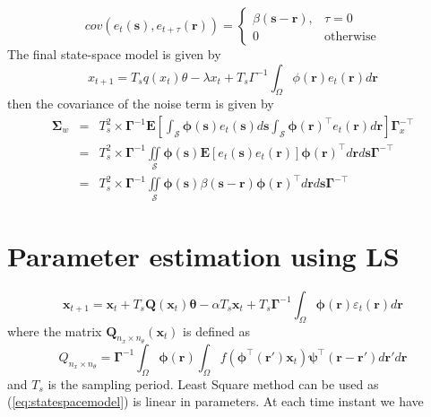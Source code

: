 \documentclass[onecolumn,draftcls]{IEEEtran}
\begin{document}
\begin{equation}
cov(e_t(\mathbf{s}),e_{t+\tau}(\mathbf{r}))=
\begin{cases}
\beta\left(\mathbf{s}-\mathbf{r}\right), & \tau=0 \\
0 & \mathrm{otherwise}
\end{cases}
\label{eq:FieldCovariance}
\end{equation}
The final state-space model is given by
\begin{equation}
x_{t + 1} = T_sq(x_t)\theta -\lambda x_t + T_s\Gamma^{-1}\int_\Omega  {\phi ( \mathbf{r} )e_t( \mathbf{r} )d\mathbf{r}}
\end{equation}
then the covariance of the noise term is given by
\begin{eqnarray}
\mathbf \Sigma_w&{}={}&T_s^2 \times \mathbf{\Gamma}^{-1}\mathbf E[\int_{\mathcal{S}}\boldsymbol\phi\left(\mathbf s\right)e_t\left(\mathbf s\right)d\mathbf s\int_{\mathcal{S}}\boldsymbol\phi\left(\mathbf r\right)^{\top}e_t\left(\mathbf r\right)d\mathbf r]\mathbf{\Gamma}_{x}^{- \top} \nonumber \\
&=&T_s^2 \times\mathbf{\Gamma}^{-1}\iint\limits_{\mathcal{S}}\boldsymbol\phi\left(\mathbf s\right) \mathbf E[e_t\left(\mathbf s\right)e_t\left(\mathbf r\right)]\boldsymbol\phi\left(\mathbf r\right)^{\top}d\mathbf r d\mathbf s\mathbf{\Gamma}^{- \top} \nonumber\\
&=&{}T_s^2 \times\mathbf{\Gamma}^{-1}\iint\limits_{\mathcal{S}}\boldsymbol\phi\left(\mathbf s\right) \beta\left(\mathbf s- \mathbf r \right)\boldsymbol\phi\left(\mathbf r\right)^{\top}d\mathbf r d\mathbf s\mathbf{\Gamma}^{- \top} 
\end{eqnarray}

\section{Parameter estimation using LS}
\begin{equation}
 \mathbf x_{t+1}=\mathbf x_{t}+T_s \mathbf Q(\mathbf x_t)\mathbf \theta-\alpha T_s\mathbf x_t+T_s\boldsymbol\Gamma^{-1}\int_\Omega\boldsymbol\phi(\mathbf r)\varepsilon_t(\mathbf r)d\mathbf r
\label{eq:statespacemodel}
\end{equation}
where the matrix $\mathbf Q_{n_x \times n_{\theta}}(\mathbf x_t)$ is defined as
\begin{equation}
 Q_{n_x \times n_{\theta}}=\boldsymbol\Gamma^{-1}\int_\Omega\boldsymbol\phi(\mathbf r)\int_\Omega f(\boldsymbol\phi^\top(\mathbf r')\mathbf x_t)\boldsymbol\psi^\top(\mathbf r-\mathbf r')d\mathbf r'd\mathbf r
\end{equation}
and $T_s$ is the sampling period. Least Square method can be used as (\ref{eq:statespacemodel}) is linear in parameters. At each time instant we have
\end{document}
